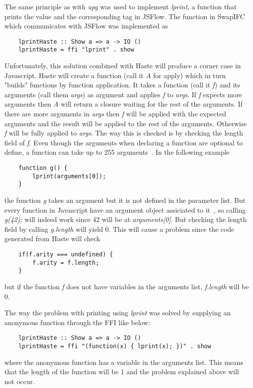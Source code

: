 The same principle as with \emph{upg} was used to implement \emph{lprint}, a function that prints the value and the corresponding tag in JSFlow. The function in SwapIFC which communicates with JSFlow was implemented as
\begin{verbatim}
    lprintHaste :: Show a => a -> IO ()
    lprintHaste = ffi "lprint" . show
\end{verbatim}
Unfortunately, this solution combined with Haste will produce a corner case in Javascript. Haste will create a function (call it \emph{A} for apply) which in turn "builds" functions by function application. It takes a function (call it \emph{f}) and its arguments (call them \emph{args}) as argument and applies \emph{f} to \emph{args}. If \emph{f} expects more arguments then \emph{A} will return a closure waiting for the rest of the arguments. If there are more arguments in \emph{args} then \emph{f} will be applied with the expected arguments and the result will be applied to the rest of the arguments. Otherwise \emph{f} will be fully applied to \emph{args}. The way this is checked is by checking the length field of \emph{f}. Even though the arguments when declaring a function are optional to define, a function can take up to 255 arguments~\cite{js-function}. In the following example
\begin{verbatim}
    function g() {
        lprint(arguments[0]);
    }
\end{verbatim}
the function \emph{g} takes an argument but it is not defined in the parameter list. But every function in Javascript have an argument object assiciated to it~\cite{js-arguments}, so calling \emph{g(42);} will indeed work since 42 will be at \emph{arguments[0]}. But checking the length field by calling \emph{g.length} will yield 0. This will cause a problem since the code generated from Haste will check
\begin{verbatim}
    if(f.arity === undefined) {
        f.arity = f.length;
    }
\end{verbatim}
but if the function \emph{f} does not have variables in the arguments list, \emph{f.length} will be 0.

The way the problem with printing using \emph{lprint} was solved by supplying an anonymous function through the FFI like below:
\begin{verbatim}
    lprintHaste :: Show a => a -> IO ()
    lprintHaste = ffi "(function(x) { lprint(x); })" . show
\end{verbatim}
where the anonymous function has a variable in the arguments list. This means that the length of the function will be 1 and the problem explained above will not occur. 

